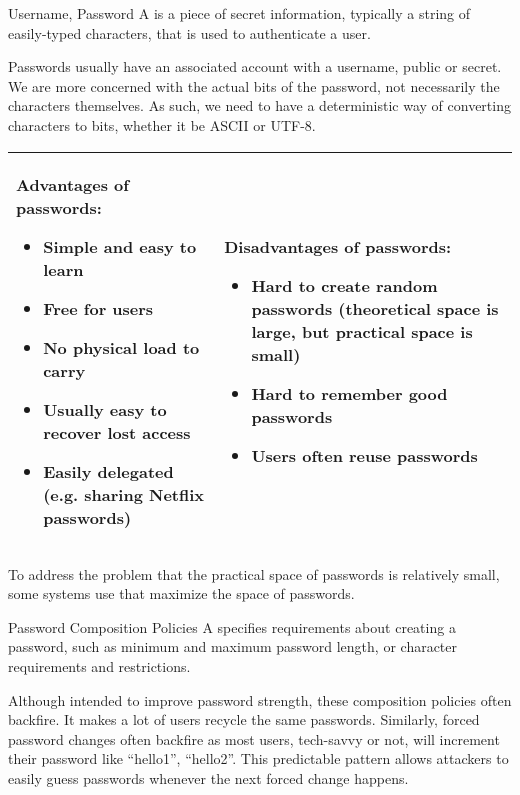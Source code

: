 \documentclass[code]{amznotes}
\begin{document}
\begin{dfnbox}{Username, Password}{}
    A  is a piece of secret information, typically a string of easily-typed characters, that is used to authenticate a user.
\end{dfnbox}


Passwords usually have an associated account with a username, public or secret. We are more concerned with the actual bits of the password, not necessarily the characters themselves. As such, we need to have a deterministic way of converting characters to bits, whether it be ASCII or UTF-8.

\begin{tabularx}{\linewidth}{| X | X |}
    \hline
    Advantages of passwords:
    \begin{itemize}[noitemsep,leftmargin=*]
        \item Simple and easy to learn
        \item Free for users
        \item No physical load to carry
        \item Usually easy to recover lost access
        \item Easily delegated (e.g. sharing Netflix passwords)
    \end{itemize}
    &
    Disadvantages of passwords:
    \begin{itemize}[noitemsep,leftmargin=*]
        \item Hard to create random passwords (theoretical space is large, but practical space is small)
        \item Hard to remember good passwords
        \item Users often reuse passwords
    \end{itemize}
    \\ \hline
\end{tabularx}

To address the problem that the practical space of passwords is relatively small, some systems use  that maximize the space of passwords.

\begin{dfnbox}{Password Composition Policies}{}
    A  specifies requirements about creating a password, such as minimum and maximum password length, or character requirements and restrictions.
\end{dfnbox}

Although intended to improve password strength, these composition policies often backfire. It makes a lot of users recycle the same passwords. Similarly, forced password changes often backfire as most users, tech-savvy or not, will increment their password like ``hello1'', ``hello2''. This predictable pattern allows attackers to easily guess passwords whenever the next forced change happens.
\end{document}
